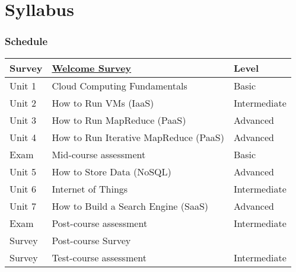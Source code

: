 \part{Syllabus}

\section{Schedule}
\begin{center}
  \begin{tabular}{|l|l|l|}
    \hline
    Survey 
    &          \href{http://} {Welcome Survey}
    &          Level \\
    \hline
    Unit 1 & Cloud Computing Fundamentals & Basic \\
    \hline 
    Unit 2 & How to Run VMs (IaaS) & Intermediate \\
    \hline
    Unit 3 & How to Run MapReduce (PaaS) & Advanced \\
    \hline
    Unit 4 & How to Run Iterative MapReduce (PaaS) & Advanced \\
    \hline
    Exam & Mid-course assessment & Basic \\
    \hline
    Unit 5 & How to Store Data (NoSQL) & Advanced \\
    \hline
    Unit 6 & Internet of Things  & Intermediate \\
    \hline
    Unit 7 & How to Build a Search Engine (SaaS) & Advanced \\
    \hline
    Exam & Post-course assessment & Intermediate \\
    \hline
    Survey & Post-course Survey  & ~ \\
    \hline
    Survey & Test-course assessment & Intermediate\\
    \hline
  \end{tabular}
\end{center}
